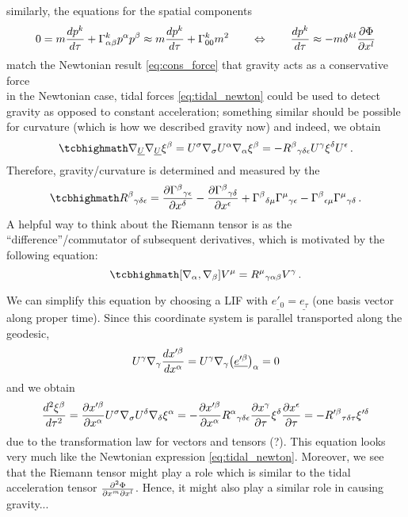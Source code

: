 similarly, the equations for the spatial components
\begin{equation}
0 = m \dv{p^k}{\tau} + \Gamma^k_{\alpha \beta} p^\alpha p^\beta \approx m \dv{p^k}{\tau} + \Gamma^k_{0 0} m^2 \qquad \Leftrightarrow \qquad \dv{p^k}{\tau} \approx - m \delta^{k l} \pdv{\Phi}{x^l}
\end{equation}
match the Newtonian result \eqref{eq:cons_force} that gravity acts as a conservative force\\


in the Newtonian case, tidal forces \eqref{eq:tidal_newton} could be used to detect gravity as opposed to constant acceleration; something similar should be possible for curvature (which is how we described gravity now) and indeed, we obtain
\begin{equation*}
\eqbox{
\nabla_{\underline{U}} \nabla_{\underline{U}} \xi^\beta = U^\sigma \nabla_\sigma U^\alpha \nabla_\alpha \xi^\beta = - R^\beta{}_{\gamma \delta \epsilon} U^\gamma \xi^\delta U^\epsilon
} \, .
\end{equation*}
Therefore, gravity/curvature is determined and measured by the 
\begin{equation}
\eqbox{
R^\beta{}_{\gamma \delta \epsilon} = \pdv{\Gamma^\beta{}_{\gamma \epsilon}}{x^\delta} - \pdv{\Gamma^\beta{}_{\gamma \delta}}{x^\epsilon} + \Gamma^\beta{}_{\delta \mu} \Gamma^\mu{}_{\gamma \epsilon} - \Gamma^\beta{}_{\epsilon \mu} \Gamma^\mu{}_{\gamma \delta}
} \, .
\end{equation}
A helpful way to think about the Riemann tensor is as the \enquote{difference}/commutator of subsequent derivatives, which is motivated by the following equation:
\begin{equation}
\eqbox{
\qty[\nabla_\alpha, \nabla_\beta] V^\mu = R^\mu{}_{\gamma \alpha \beta} V^\gamma
} \, .
\end{equation}


We can simplify this equation by choosing a LIF with $\underline{e'_0} = \underline{e_\tau}$ (one basis vector along proper time). Since this coordinate system is parallel transported along the geodesic,
\begin{equation*}
U^\gamma \nabla_\gamma \dv{x'^\beta}{x^\alpha} = U^\gamma \nabla_\gamma \qty(\underline{e'^\beta})_\alpha = 0
\end{equation*}
and we obtain
\begin{equation}
\dv[2]{\xi^\beta}{\tau} = \pdv{x'^\beta}{x^\alpha} U^\sigma \nabla_\sigma U^\delta \nabla_\delta \xi^\alpha = - \pdv{x'^\beta}{x^\alpha} R^\alpha{}_{\gamma \delta \epsilon} \pdv{x^\gamma}{\tau} \xi^\delta \pdv{x^\epsilon}{\tau} = - R'^\beta{}_{\tau \delta \tau} \xi'^\delta
\end{equation}
due to the transformation law for vectors and tensors (?). This equation looks very much like the Newtonian expression \eqref{eq:tidal_newton}. Moreover, we see that the Riemann tensor might play a role which is similar to the tidal acceleration tensor $\pdv[2]{\Phi}{x^m}{x^l}$. Hence, it might also play a similar role in causing gravity...



